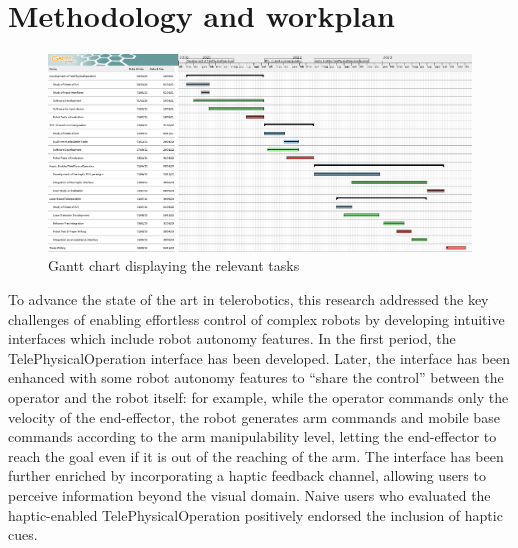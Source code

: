 \section{Methodology and workplan}

%	

\begin{figure}[H]
	\centering
	\includegraphics[width=1\linewidth]{img/PHD_thirdYear}
	\caption{Gantt chart displaying the relevant tasks}
	\label{fig:phdthirdyear}
\end{figure}



To advance the state of the art in telerobotics, this research addressed the key challenges of enabling effortless control of complex robots by developing intuitive interfaces which include robot autonomy features.
In the first period, the TelePhysicalOperation interface has been developed. Later, the interface has been enhanced with some robot autonomy features to \enquote{share the control} between the operator and the robot itself: for example, while the operator commands only the velocity of the end-effector, the robot generates arm commands and mobile base commands according to the arm manipulability level, letting the end-effector to reach the goal even if it is out of the reaching of the arm.
The interface has been further enriched by incorporating a haptic feedback channel, allowing users to perceive information beyond the visual domain. Naive users who evaluated the haptic-enabled TelePhysicalOperation positively endorsed the inclusion of haptic cues.

